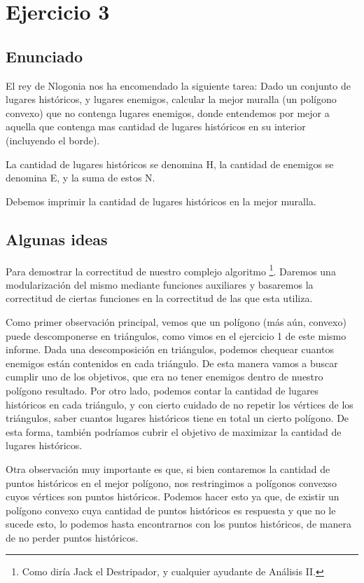 \section{Ejercicio 3}

\subsection{Enunciado}

El rey de Nlogonia nos ha encomendado la siguiente tarea: Dado un conjunto de lugares históricos, y lugares enemigos, calcular la mejor muralla (un polígono convexo) que no contenga lugares enemigos, donde entendemos por mejor a aquella que contenga mas cantidad de lugares históricos en su interior (incluyendo el borde).

La cantidad de lugares históricos se denomina H, la cantidad de enemigos se denomina E, y la suma de estos N.

Debemos imprimir la cantidad de lugares históricos en la mejor muralla.

\subsection{Algunas ideas}
\par{Para demostrar la correctitud de nuestro complejo algoritmo \footnote{Como diría Jack el Destripador, y cualquier ayudante de Análisis II.}. Daremos una modularización del mismo mediante funciones auxiliares y basaremos la correctitud de ciertas funciones en la correctitud de las que esta utiliza.} 
\par{Como primer observación principal, vemos que un polígono (más aún, convexo) puede descomponerse en triángulos, como vimos en el ejercicio 1 de este mismo informe. Dada una descomposición en triángulos, podemos chequear cuantos enemigos están contenidos en cada triángulo. De esta manera vamos a buscar cumplir uno de los objetivos, que era no tener enemigos dentro de nuestro polígono resultado. Por otro lado, podemos contar la cantidad de lugares históricos en cada triángulo, y con cierto cuidado de no repetir los vértices de los triángulos, saber cuantos lugares históricos tiene en total un cierto polígono. De esta forma, también podríamos cubrir el objetivo de maximizar la cantidad de lugares históricos.}
\par{Otra observación muy importante es que, si bien contaremos la cantidad de puntos históricos en el mejor polígono, nos restringimos a polígonos convexso cuyos vértices son puntos históricos. Podemos hacer esto ya que, de existir un polígono convexo cuya cantidad de puntos históricos es respuesta y que no le sucede esto, lo podemos  hasta encontrarnos con los puntos históricos, de manera de no perder puntos históricos.}

